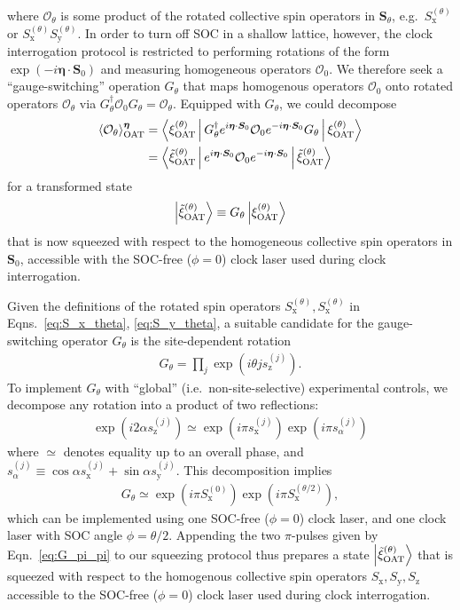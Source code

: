 \documentclass[aps,prx,superscriptaddress,twocolumn]{revtex4-2}
\renewcommand{\t}{\text} %
\newcommand{\p}[1]{\left(#1\right)} %
\renewcommand{\c}{\cdot} %
\renewcommand{\v}{\bm} %
\newcommand{\bk}{\Braket}
\renewcommand{\ket}{\Ket}
\renewcommand{\O}{\mathcal{O}}
\newcommand{\z}{\text{z}}
\newcommand{\x}{\text{x}}
\newcommand{\y}{\text{y}}
\begin{document}
where $\O_\theta$ is some product of the rotated collective spin operators in $\v S_\theta$, e.g.~$S_\x^{(\theta)}$ or $S_\x^{(\theta)} S_\y^{(\theta)}$.
In order to turn off SOC in a shallow lattice, however, the clock interrogation protocol is restricted to performing rotations of the form $\exp\p{-i\v\eta\c\v S_0}$ and measuring homogeneous operators $\O_0$.
We therefore seek a ``gauge-switching'' operation $G_\theta$ that maps homogenous operators $\O_0$ onto rotated operators $\O_\theta$ via $G_\theta^\dag \O_0 G_\theta = \O_\theta$.
Equipped with $G_\theta$, we could decompose
\begin{align}
  \bk{\O_\theta}_{\t{OAT}}^{\v\eta}
  &= \bk{\xi_{\t{OAT}}^{(\theta)}| G_\theta^\dag e^{i\v\eta\c\v S_0}
    \O_0 e^{-i\v\eta\c\v S_0} G_\theta |\xi_{\t{OAT}}^{(\theta)}}
  \notag \\
  &= \bk{\tilde \xi_{\t{OAT}}^{(\theta)}| e^{i\v\eta\c\v S_0}
    \O_0 e^{-i\v\eta\c\v S_0} |\tilde \xi_{\t{OAT}}^{(\theta)}}
\end{align}
for a transformed state
\begin{align}
  \ket{\tilde \xi_{\t{OAT}}^{(\theta)}}
  \equiv G_\theta \ket{\xi_{\t{OAT}}^{(\theta)}}
\end{align}
that is now squeezed with respect to the homogeneous collective spin operators in $\v S_0$, accessible with the SOC-free ($\phi=0$) clock laser used during clock interrogation.

Given the definitions of the rotated spin operators $S_\x^{(\theta)},S_\x^{(\theta)}$ in Eqns.~\eqref{eq:S_x_theta}, \eqref{eq:S_y_theta}, a suitable candidate for the gauge-switching operator $G_\theta$ is the site-dependent rotation
\begin{align}
  G_\theta = \prod_j \exp\p{i\theta j s_\z^{(j)}}.
\end{align}
To implement $G_\theta$ with ``global'' (i.e.~non-site-selective) experimental controls, we decompose any rotation into a product of two reflections:
\begin{align}
  \exp\p{i2\alpha s_\z^{(j)}}
  \simeq \exp\p{i\pi s_\x^{(j)}} \exp\p{i\pi s_\alpha^{(j)}}
\end{align}
where $\simeq$ denotes equality up to an overall phase, and $s_\alpha^{(j)} \equiv \cos\alpha s_\x^{(j)} + \sin\alpha s_\y^{(j)}$.
This decomposition implies
\begin{align}
  G_\theta \simeq \exp\p{i\pi S_\x^{(0)}} \exp\p{i\pi S_\x^{(\theta/2)}},
  \label{eq:G_pi_pi}
\end{align}
which can be implemented using one SOC-free ($\phi=0$) clock laser, and one clock laser with SOC angle $\phi=\theta/2$.
Appending the two $\pi$-pulses given by Eqn.~\eqref{eq:G_pi_pi} to our squeezing protocol thus prepares a state $\ket{\tilde\xi_{\t{OAT}}^{(\theta)}}$ that is squeezed with respect to the homogenous collective spin operators $S_\x,S_\y,S_\z$ accessible to the SOC-free ($\phi=0$) clock laser used during clock interrogation.
\end{document}
